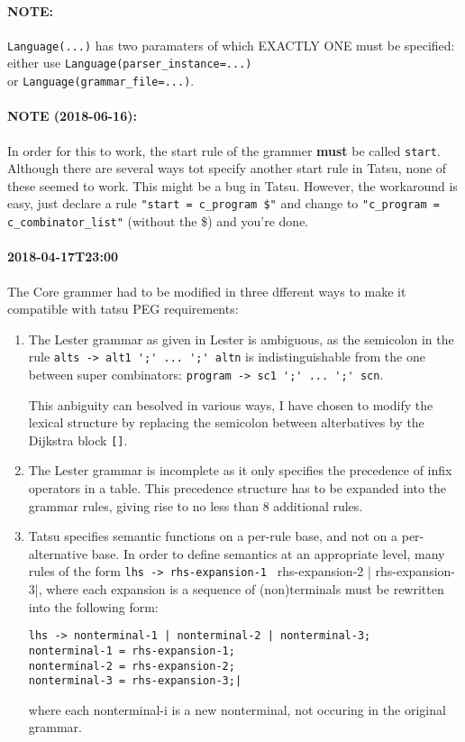 \documentclass[11pt, a4paper]{article}
\begin{document}
\paragraph{NOTE:} \verb|Language(...)| has two paramaters of which EXACTLY ONE must be specified: either use
\verb|Language(parser_instance=...)| \\
or \verb|Language(grammar_file=...)|.

\paragraph{NOTE (2018-06-16):} In order for this to work, the start rule of the grammer \textbf{must} be called \verb|start|. 
Although there are several ways tot specify another start rule in Tatsu, none of these seemed to work. 
This might be a bug in Tatsu. 
However, the workaround is easy, just declare a rule \verb|"start = c_program $"| and change to \verb|"c_program = c_combinator_list"| (without the \$) and you're done.

\paragraph{2018-04-17T23:00}

The Core grammer had to be modified in three dfferent ways to make it compatible with tatsu PEG requirements:

\begin{enumerate}

\item The Lester grammar as given in Lester is ambiguous, as the semicolon in the rule 
\verb|alts -> alt1 ';' ... ';' altn|
is indistinguishable from the one between super combinators:
\verb|program -> sc1 ';' ... ';' scn|.

This anbiguity can besolved in various ways, I have chosen to modify the lexical structure by replacing the semicolon between alterbatives by the Dijkstra block \verb|[]|.

\item The Lester grammar is incomplete as it only specifies the precedence of infix operators in a table. This precedence structure has to be expanded into the grammar rules, giving rise to no less than 8 additional rules.

\item Tatsu specifies semantic functions on a per-rule base, and not on a per-alternative base. In order to define semantics at an appropriate level, many rules of the form
\verb|lhs -> rhs-expansion-1 | rhs-expansion-2 | rhs-expansion-3|, 
where each expansion is a sequence of (non)terminals must be rewritten into the following form:

\begin{Verbatim}
lhs -> nonterminal-1 | nonterminal-2 | nonterminal-3;
nonterminal-1 = rhs-expansion-1;
nonterminal-2 = rhs-expansion-2;
nonterminal-3 = rhs-expansion-3;|
\end{Verbatim}
where each nonterminal-i is a new nonterminal, not occuring in the original grammar.
\end{enumerate}
\end{document}
